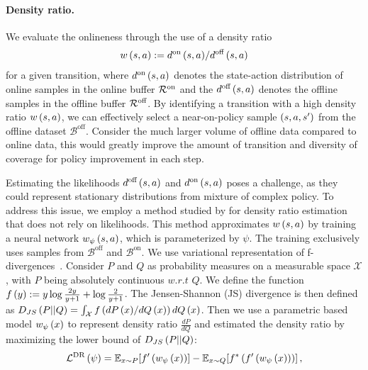 \paragraph{Density ratio.}
We evaluate the onlineness through the use of a density ratio 
\begin{align}\label{eq:densityratio}
{w} \left( {s,a} \right) := {d^{\text{on}} \left( {s,a} \right) }/ {d^{\text{off}} \left( {s,a} \right) }
\end{align}
for a given transition, where $d^{\text{on}} \left( {s,a} \right) $ denotes the state-action distribution of online samples in the online buffer $\mathcal{R}^{\text{on}}$ and the $d^{\text{off}} \left( {s,a} \right) $ denotes the offline samples in the offline buffer $\mathcal{R}^{\text{off}}$. By identifying a transition with a high density ratio ${w} \left( {s,a} \right) $, we can effectively select a near-on-policy sample $ \left( {s,a,s'} \right) $ from the offline dataset $\mathcal{B}^{\text{off}}$. 
Consider the much larger volume of offline data compared to online data, this would greatly improve the amount of transition and diversity of coverage for policy improvement in each step.


Estimating the likelihoods $d^{\text{off}} \left( {s,a} \right) $ and $d^{\text{on}} \left( {s,a} \right) $ poses a challenge, as they could represent stationary distributions from mixture of complex policy.
To address this issue, we employ a method studied by \citet{lee2022offline,sinha2022experience} for density ratio estimation that does not rely on likelihoods.  This method approximates ${w} \left( {s,a} \right) $ by training a neural network ${w}_{\psi} \left( {s,a} \right) $, which is parameterized by $\psi$. The training exclusively uses samples from $\mathcal{B}^{\text{off}}$ and $\mathcal{B}^{\text{on}}$. 
We use variational representation of f-divergences~\citep{nguyen2007estimating}. Consider $P$ and $Q$ as probability measures on a measurable space $\mathcal{X}$, with $P$ being absolutely continuous $w.r.t$ $Q$.
We define the function $f \left( {y} \right) :=y \log\frac{2y}{y+1}+\log\frac{2}{y+1}$. 
The Jensen-Shannon (JS) divergence is then defined as $D_{JS} \left( {P||Q} \right) =\int_{\mathcal{X}}f \left( { {dP \left( {x} \right) } / {dQ \left( {x} \right) }} \right) dQ \left( {x} \right) $.
Then we use a parametric based model ${w}_{\psi} \left( {x} \right) $ to represent density ratio $\frac{dP}{dQ}$
and estimated the density ratio by maximizing the lower bound of $D_{JS} \left( {P||Q} \right) $: 
\begin{equation*}\label{eq:lower_bound}
    \mathcal{L}^{\text{DR}} \left( {\psi} \right) = \mathbb{E}_{x\sim P}\!\left[f' \left( {{w}_{\psi} \left( {x} \right) } \right) \right]- \mathbb{E}_{x\sim Q}\!\left[f^* \left( {f' \left( {{w}_{\psi} \left( {x} \right) } \right) } \right) \right],
\end{equation*}

